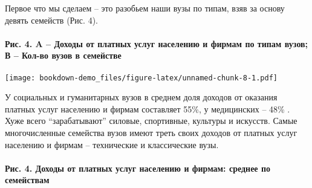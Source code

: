 \documentclass[]{book}
\let\oldparagraph\paragraph
\renewcommand{\paragraph}[1]{\oldparagraph{#1}\mbox{}}
\begin{document}
Первое что мы сделаем -- это разобьем наши вузы по типам, взяв за основу девять семейств (Рис. 4).

\hypertarget{ux440ux438ux441.-4.-a-ux434ux43eux445ux43eux434ux44b-ux43eux442-ux43fux43bux430ux442ux43dux44bux445-ux443ux441ux43bux443ux433-ux43dux430ux441ux435ux43bux435ux43dux438ux44e-ux438-ux444ux438ux440ux43cux430ux43c-ux43fux43e-ux442ux438ux43fux430ux43c-ux432ux443ux437ux43eux432-ux432-ux43aux43eux43b-ux432ux43e-ux432ux443ux437ux43eux432-ux432-ux441ux435ux43cux435ux439ux441ux442ux432ux435}{%
\paragraph{Рис. 4. A -- Доходы от платных услуг населению и фирмам по типам вузов; В -- Кол-во вузов в семействе}\label{ux440ux438ux441.-4.-a-ux434ux43eux445ux43eux434ux44b-ux43eux442-ux43fux43bux430ux442ux43dux44bux445-ux443ux441ux43bux443ux433-ux43dux430ux441ux435ux43bux435ux43dux438ux44e-ux438-ux444ux438ux440ux43cux430ux43c-ux43fux43e-ux442ux438ux43fux430ux43c-ux432ux443ux437ux43eux432-ux432-ux43aux43eux43b-ux432ux43e-ux432ux443ux437ux43eux432-ux432-ux441ux435ux43cux435ux439ux441ux442ux432ux435}}

\texttt{[image: bookdown-demo\_files/figure-latex/unnamed-chunk-8-1.pdf]}

У социальных и гуманитарных вузов в среднем доля доходов от оказания платных услуг населению и фирмам составляет 55\%, у медицинских -- 48\% . Хуже всего ``зарабатывают'' силовые, спортивные, культуры и искусств. Самые многочисленные семейства вузов имеют треть своих доходов от платных услуг населению и фирмам -- технические и классические вузы.

\hypertarget{ux440ux438ux441.-4.-ux434ux43eux445ux43eux434ux44b-ux43eux442-ux43fux43bux430ux442ux43dux44bux445-ux443ux441ux43bux443ux433-ux43dux430ux441ux435ux43bux435ux43dux438ux44e-ux438-ux444ux438ux440ux43cux430ux43c-ux441ux440ux435ux434ux43dux435ux435-ux43fux43e-ux441ux435ux43cux435ux439ux441ux442ux432ux430ux43c}{%
\paragraph{\texorpdfstring{Рис. 4. Доходы от платных услуг населению и фирмам: { среднее по семействам }}{Рис. 4. Доходы от платных услуг населению и фирмам:  среднее по семействам }}\label{ux440ux438ux441.-4.-ux434ux43eux445ux43eux434ux44b-ux43eux442-ux43fux43bux430ux442ux43dux44bux445-ux443ux441ux43bux443ux433-ux43dux430ux441ux435ux43bux435ux43dux438ux44e-ux438-ux444ux438ux440ux43cux430ux43c-ux441ux440ux435ux434ux43dux435ux435-ux43fux43e-ux441ux435ux43cux435ux439ux441ux442ux432ux430ux43c}}
\end{document}
